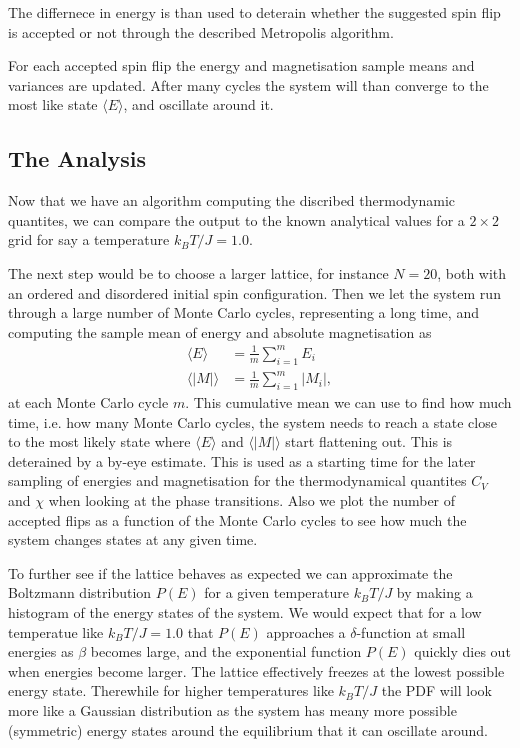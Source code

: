 \documentclass[twocolumn]{aastex62}
\begin{document}
The differnece in energy is than used to deterain whether the suggested spin
flip is accepted or not through the described Metropolis algorithm.

For each accepted spin flip the energy and magnetisation sample means and variances are
updated. After many cycles the system will than converge to the most like state
$\langle E\rangle$, and oscillate around it. 


\subsection{The Analysis}\label{subsec:analysis}
Now that we have an algorithm computing the discribed thermodynamic quantites,
we can compare the output to the known analytical values for a $2\times 2$ grid
for say a temperature $k_BT/J = 1.0$.

The next step would be to choose a larger lattice, for instance $N = 20$, both
with an ordered and disordered initial spin configuration. Then we let the
system run through a large number of Monte Carlo cycles, representing a long
time, and computing the sample mean of energy and absolute magnetisation as
\begin{align}
	\langle E\rangle &= \frac{1}{m}\sum_{i = 1}^m E_i\\
	\langle |M|\rangle &= \frac{1}{m}\sum_{i = 1}^m |M_i|,
\end{align} 
at each Monte Carlo cycle $m$. This cumulative mean we can use to find how much
time, i.e. how many Monte Carlo cycles, the system needs to reach a state close
to the most likely state where $\langle E \rangle$ and $\langle |M|\rangle$
start flattening out. This is deterained by a by-eye estimate. This is used as a
starting time for the later sampling of energies and magnetisation for
the thermodynamical quantites $C_V$ and $\chi$ when looking at the phase
transitions. 
Also we plot the number of accepted flips as a function of the Monte Carlo
cycles to see how much the system changes states at any given time.

To further see if the lattice behaves as expected we can approximate the
Boltzmann distribution $P(E)$ for a given temperature $k_BT/J$ by making a
histogram of the energy states of the system. We would expect that for a low
temperatue like $k_BT / J = 1.0$ that $P(E)$ approaches a $\delta$-function at
small energies as
$\beta$ becomes large, and the exponential function $P(E)$ quickly dies out when
energies become larger. The lattice effectively freezes at the lowest possible
energy state. Therewhile for higher temperatures like $k_BT/J$ the PDF
will look more like a Gaussian distribution as the system has meany more
possible (symmetric) energy states around the equilibrium that it can oscillate
around. 
\end{document}
